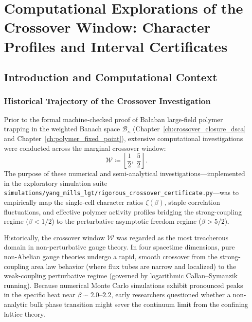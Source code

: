 \chapter[Computational Explorations of the Crossover Window]{Computational Explorations of the Crossover Window: Character Profiles and Interval Certificates}
\label{app:interval_certificates}

\section{Introduction and Computational Context}
\label{sec:app_b_intro}

\subsection{Historical Trajectory of the Crossover Investigation}
\label{subsec:app_b_history}

Prior to the formal machine-checked proof of Ba\l aban large-field polymer trapping in the weighted Banach space $\mathcal{B}_\kappa$ (Chapter~\ref{ch:crossover_closure_dsca} and Chapter~\ref{ch:polymer_fixed_point}), extensive computational investigations were conducted across the marginal crossover window:
\begin{equation}
\label{eq:app_b_crossover_def}
\mathcal{W} \coloneqq \left[ \frac{1}{2}, \; \frac{5}{2} \right].
\end{equation}
The purpose of these numerical and semi-analytical investigations—implemented in the exploratory simulation suite \texttt{simulations/yang\_mills\_lgt/rigorous\_crossover\_certificate.py}—was to empirically map the single-cell character ratios $\zeta(\beta)$, staple correlation fluctuations, and effective polymer activity profiles bridging the strong-coupling regime ($\beta < 1/2$) to the perturbative asymptotic freedom regime ($\beta > 5/2$).

Historically, the crossover window $\mathcal{W}$ was regarded as the most treacherous domain in non-perturbative gauge theory. In four spacetime dimensions, pure non-Abelian gauge theories undergo a rapid, smooth crossover from the strong-coupling area law behavior (where flux tubes are narrow and localized) to the weak-coupling perturbative regime (governed by logarithmic Callan--Symanzik running). Because numerical Monte Carlo simulations exhibit pronounced peaks in the specific heat near $\beta \sim 2.0$--$2.2$, early researchers questioned whether a non-analytic bulk phase transition might sever the continuum limit from the confining lattice theory.

